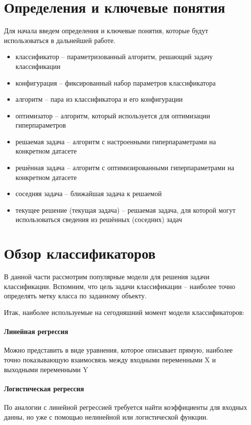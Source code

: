 \documentclass[times,specification,annotation]{itmo-student-thesis}
\begin{document}
	\section{Определения и ключевые понятия}
	Для начала введем определения и ключевые понятия, которые будут использоваться в дальнейшей работе.
	\begin{itemize}
		\item классификатор -- параметризованный алгоритм, решающий задачу классификации
		\item конфигурация -- фиксированный набор параметров классификатора
		\item алгоритм -- пара из классификатора и его конфигурации 
		\item оптимизатор -- алгоритм, который используется для оптимизации гиперпараметров
		\item решаемая задача -- алгоритм с настроенными гиперпараметрами на конкретном датасете
		\item решённая задача -- алгоритм с оптимизированными гиперпараметрами на конкретном датасете
		\item соседняя задача -- ближайшая задача к решаемой
		\item текущее решение (текущая задача) -- решаемая задача, для которой могут использоваться сведения из решённых (соседних) задач
	\end{itemize}
	\section{Обзор классификаторов}
	В данной части рассмотрим популярные модели для решения задачи классификации. Вспомним, что цель задачи классификации -- наиболее точно определять метку класса по заданному объекту. \par
	Итак, наиболее используемые на сегодняшний момент модели классификаторов:
	
	\paragraph{Линейная регрессия} Можно представить в виде уравнения, которое описывает прямую, наиболее точно показывающую взаимосвязь между входными переменными X и выходными переменными Y
	\paragraph{Логистическая регрессия} По аналогии с линейной регрессией требуется найти коэффициенты для входных данны, но уже с помощью нелинейной или логистической функции.
\end{document}
